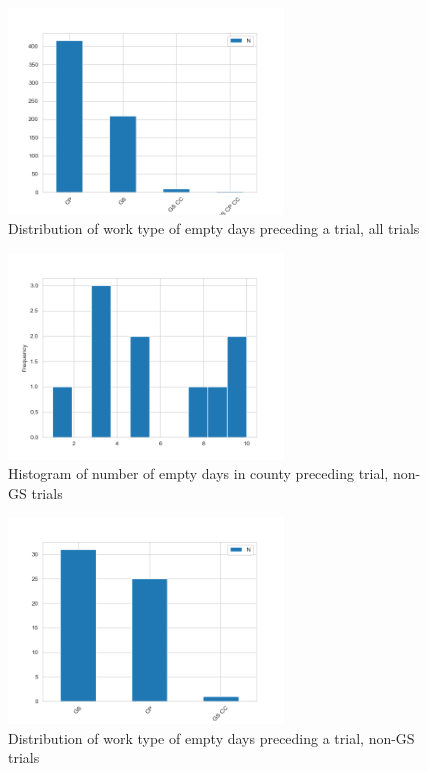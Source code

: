 \documentclass[11pt]{article}
\begin{document}
    \begin{figure}[H]
      \centering
      \caption{Distribution of work type of empty days preceding a trial, all trials}
      \includegraphics[width=0.65\textwidth]{../../../output/figures/Exploration/empty_days_work_type_All.png}
    \end{figure}

    \begin{figure}[H]
      \centering
      \caption{Histogram of number of empty days in county preceding trial, non-GS trials}
      \includegraphics[width=0.65\textwidth]{../../../output/figures/Exploration/empty_days_hist_NonGS.png}
    \end{figure}

    \begin{figure}[H]
      \centering
      \caption{Distribution of work type of empty days preceding a trial, non-GS trials}
      \includegraphics[width=0.65\textwidth]{../../../output/figures/Exploration/empty_days_work_type_NonGS.png}
    \end{figure}
\end{document}
